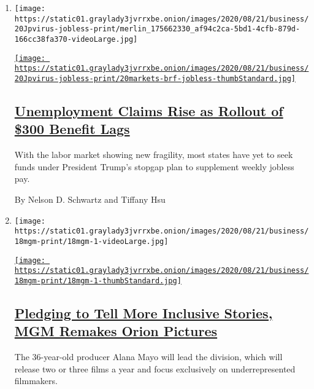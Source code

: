 \begin{enumerate}
\def\labelenumi{\arabic{enumi}.}
\item
  \texttt{[image: https://static01.graylady3jvrrxbe.onion/images/2020/08/21/business/20Jpvirus-jobless-print/merlin\_175662330\_af94c2ca-5bd1-4cfb-879d-166cc38fa370-videoLarge.jpg]}

  \href{/2020/08/20/business/economy/unemployment-claims.html}{\texttt{[image: https://static01.graylady3jvrrxbe.onion/images/2020/08/21/business/20Jpvirus-jobless-print/20markets-brf-jobless-thumbStandard.jpg]}}

  \hypertarget{unemployment-claims-rise-as-rollout-of-300-benefit-lags}{%
  \subsection{\texorpdfstring{\href{/2020/08/20/business/economy/unemployment-claims.html}{Unemployment
  Claims Rise as Rollout of \$300 Benefit
  Lags}}{Unemployment Claims Rise as Rollout of \$300 Benefit Lags}}\label{unemployment-claims-rise-as-rollout-of-300-benefit-lags}}

  With the labor market showing new fragility, most states have yet to
  seek funds under President Trump's stopgap plan to supplement weekly
  jobless pay.

  By Nelson D. Schwartz and Tiffany Hsu
\item
  \texttt{[image: https://static01.graylady3jvrrxbe.onion/images/2020/08/21/business/18mgm-print/18mgm-1-videoLarge.jpg]}

  \href{/2020/08/20/business/media/mgm-orion-pictures-alana-mayo.html}{\texttt{[image: https://static01.graylady3jvrrxbe.onion/images/2020/08/21/business/18mgm-print/18mgm-1-thumbStandard.jpg]}}

  \hypertarget{pledging-to-tell-more-inclusive-stories-mgm-remakes-orion-pictures}{%
  \subsection{\texorpdfstring{\href{/2020/08/20/business/media/mgm-orion-pictures-alana-mayo.html}{Pledging
  to Tell More Inclusive Stories, MGM Remakes Orion
  Pictures}}{Pledging to Tell More Inclusive Stories, MGM Remakes Orion Pictures}}\label{pledging-to-tell-more-inclusive-stories-mgm-remakes-orion-pictures}}

  The 36-year-old producer Alana Mayo will lead the division, which will
  release two or three films a year and focus exclusively on
  underrepresented filmmakers.


\end{enumerate}
